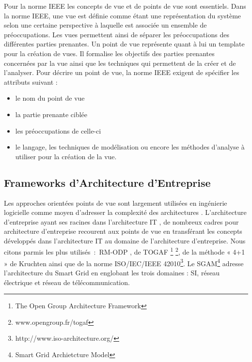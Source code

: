 Pour la norme IEEE les concepts de vue et de points de vue sont 
essentiels. 
Dans la norme IEEE, une vue est définie comme étant une représentation du système selon une certaine perspective à laquelle est associée un ensemble de préoccupations. Les vues 
permettent ainsi de séparer les préoccupations des différentes parties 
prenantes. Un point de vue représente quant à lui un template pour la création de 
vues. Il formalise les objectifs des parties prenantes concernées par la vue 
ainsi que les techniques qui permettent de la créer et de l'analyser. Pour 
décrire un point de vue, la norme IEEE exigent de spécifier les attributs 
suivant :
\begin{itemize}
\item le nom du point de vue
\item la partie prenante ciblée
\item les préoccupations de celle-ci
\item le langage, les techniques de modélisation ou encore les méthodes 
d'analyse à utiliser pour la création de la vue. 
\end{itemize}

	\subsection{Frameworks d'Architecture d'Entreprise}

Les approches orientées points de vue sont largement utilisées en ingénierie logicielle comme moyen d'adresser la complexité des architectures \cite{steen2004supporting}. L'architecture d'entreprise ayant ses racines dans l'architecture IT \cite{winter2008enterprise}, de nombreux cadres pour architecture d'entreprise 
recourent aux points de vue en transférant les concepts développés dans 
l'architecture IT au domaine de l'architecture d'entreprise. Nous citons parmis les plus utilisés~:~RM-ODP \cite{raymond1995reference}, de TOGAF \footnote{The Open Group Architecture Framework} \footnote{www.opengroup.fr/togaf}, de la méthode « 4+1 » de Kruchten \cite{kruchten19954+} ainsi que de la norme ISO/IEC/IEEE 42010\footnote{http://www.iso-architecture.org/}. Le SGAM\footnote{Smart Grid Archietcture Model} \cite{uslar2012standardization} adresse l'architecture du Smart Grid en englobant les trois domaines : SI, réseau électrique et réseau de télécommunication. 

